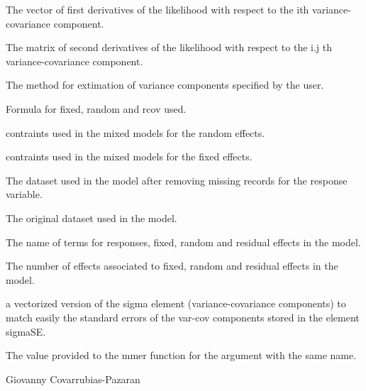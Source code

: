 \documentclass[a4paper]{book}
\begin{document}
\begin{Value}
\begin{ldescription}
\item[\code{dL}] The vector of first derivatives of the likelihood with respect to the ith variance-covariance component.
\item[\code{dL2}] The matrix of second derivatives of the likelihood with respect to the i.j th variance-covariance component.
\item[\code{method}] The method for extimation of variance components specified by the user.
\item[\code{call}] Formula for fixed, random and rcov used.
\item[\code{constraints}] contraints used in the mixed models for the random effects.
\item[\code{constraintsF}] contraints used in the mixed models for the fixed effects.
\item[\code{data}] The dataset used in the model after removing missing records for the response variable.
\item[\code{dataOriginal}] The original dataset used in the model.
\item[\code{terms}] The name of terms for responses, fixed, random and residual effects in the model.
\item[\code{termsN}] The number of effects associated to fixed, random and residual effects in the model.
\item[\code{sigmaVector}] a vectorized version of the sigma element (variance-covariance components) to match easily the standard errors of the var-cov components stored in the element sigmaSE.
\item[\code{reshapeOutput}] The value provided to the mmer function for the argument with the same name.

\end{ldescription}
\end{Value}
%
\begin{Author}\relax
Giovanny Covarrubias-Pazaran
\end{Author}
%
\end{document}

